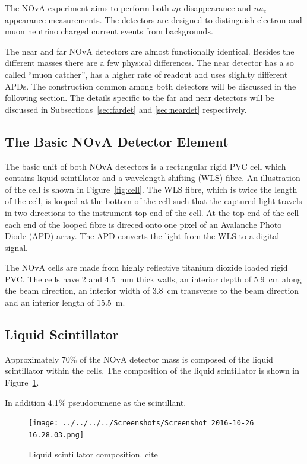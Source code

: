 The NOvA experiment aims to perform both $\nu{\mu}$ disappearance and
$nu_e$ appearance measurements. The
detectors are designed to distinguish electron and muon neutrino
charged current events from backgrounds. 

The near and far NOvA detectors are almost functionally
identical. Besides
the different masses there are a few physical
differences. The near detector has a so called ``muon catcher'', has a
higher rate of readout and uses slighlty different APDs. The
construction common among both detectors will be discussed in the
following section. The details specific to the far and near detectors
will be discussed in Subsections~\ref{sec:fardet} and
\ref{sec:neardet} respectively.

\subsection{The Basic NOvA Detector Element}

The basic unit of both NOvA detectors is a rectangular rigid PVC cell
which contains liquid scintillator and a wavelength-shifting (WLS)
fibre. An illustration of the cell is shown in
Figure~\ref{fig:cell}. The WLS fibre, which is twice the length of the
cell, is looped at the bottom of the cell such that the captured light
travels in two directions to the instrument top end of the cell. At
the top end of the cell each end of the looped fibre is direced onto
one pixel of an Avalanche Photo Diode (APD) array. The APD converts
the light from the WLS to a digital signal.

The NOvA cells are made from highly reflective titanium dioxide loaded
rigid PVC. The cells have 2 and 4.5~mm thick walls, an interior depth
of 5.9~cm along the beam direction, an interior width of 3.8~cm
transverse to the beam direction and an interior length of 15.5~m.


\subsection{Liquid Scintillator}

Approximately 70\% of the NOvA detector mass is composed of the liquid
scintillator within the cells. The composition of the liquid
scintillator is shown in Figure~\ref{fig:scintComp}. 

In addition 4.1\% pseudocumene as
the scintillant.

\begin{figure}
  \centering
  \texttt{[image: ../../../../Screenshots/Screenshot 2016-10-26 16.28.03.png]}
  \caption{Liquid scintillator composition. cite }
  \label{fig:scintComp}
\end{figure}

